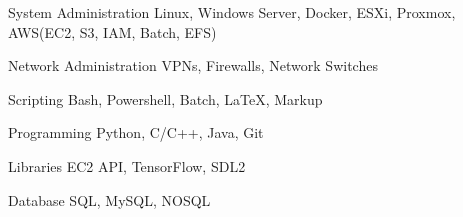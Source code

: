 
\begin{cvskills}

  \cvskill
    {System Administration} %
    {Linux, Windows Server, Docker, ESXi, Proxmox, AWS(EC2, S3, IAM, Batch, EFS)} %

  \cvskill
    {Network Administration} %
    {VPNs, Firewalls, Network Switches} %
    
  \cvskill
    {Scripting} %
    {Bash, Powershell, Batch, LaTeX, Markup} %

  \cvskill
    {Programming} %
    {Python, C/C++, Java, Git} %

  \cvskill
    {Libraries} %
    {EC2 API, TensorFlow, SDL2} %
    
  \cvskill
    {Database} %
    {SQL, MySQL, NOSQL} %
    
\end{cvskills}
